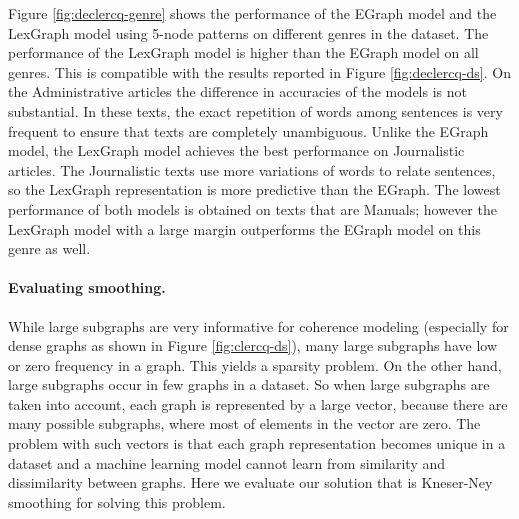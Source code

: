 Figure \ref{fig:declercq-genre} shows the performance of the EGraph model and the LexGraph model using 5-node patterns on different genres in the \declercqds dataset. 
The performance of the LexGraph model is higher than the EGraph model on all genres. 
This is compatible with the results reported in Figure \ref{fig:declercq-ds}. 
On the Administrative articles the difference in accuracies of the models is not substantial.  
In these texts, the exact repetition of words among sentences is very frequent to ensure that texts are completely unambiguous. 
Unlike the EGraph model, the LexGraph model achieves the best performance on Journalistic articles. 
The Journalistic texts use more variations of words to relate sentences, so the LexGraph representation is more predictive than the EGraph. 
The lowest performance of both models is obtained on texts that are Manuals; however the LexGraph model with a large margin outperforms the EGraph model on this genre as well. 

\paragraph{Evaluating smoothing.}
While large subgraphs are very informative for coherence modeling (especially for dense graphs as shown in Figure \ref{fig:clercq-ds}), many large subgraphs have low or zero frequency in a graph.
This yields a sparsity problem. 
On the other hand, large subgraphs occur in few graphs in a dataset. 
So when large subgraphs are taken into account, each graph is represented by a large vector, because there are many possible subgraphs, where most of elements in the vector are zero.   
The problem with such vectors is that each graph representation becomes unique in a dataset and a machine learning model cannot learn from similarity and dissimilarity between graphs. 
Here we evaluate our solution that is Kneser-Ney smoothing for solving this problem. 

